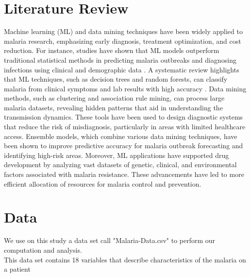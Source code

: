 \documentclass[12pt,a4paper]{article}
\begin{document}
\section{Literature Review}
Machine learning (ML) and data mining techniques have been widely applied to malaria research, emphasizing early diagnosis, treatment optimization, and cost reduction. For instance, studies have shown that ML models outperform traditional statistical methods in predicting malaria outbreaks and diagnosing infections using clinical and demographic data \cite{Li2022}. A systematic review highlights that ML techniques, such as decision trees and random forests, can classify malaria from clinical symptoms and lab results with high accuracy \cite{Zhang2021}. Data mining methods, such as clustering and association rule mining, can process large malaria datasets, revealing hidden patterns that aid in understanding the transmission dynamics. These tools have been used to design diagnostic systems that reduce the risk of misdiagnosis, particularly in areas with limited healthcare access. Ensemble models, which combine various data mining techniques, have been shown to improve predictive accuracy for malaria outbreak forecasting and identifying high-risk areas. Moreover, ML applications have supported drug development by analyzing vast datasets of genetic, clinical, and environmental factors associated with malaria resistance. These advancements have led to more efficient allocation of resources for malaria control and prevention.


\section{Data}

We use on this study a data set call "Malaria-Data.csv" to perform our computation and analysis. \\
This data set contains 18 variables that describe characteristics of the malaria on a patient
\end{document}
